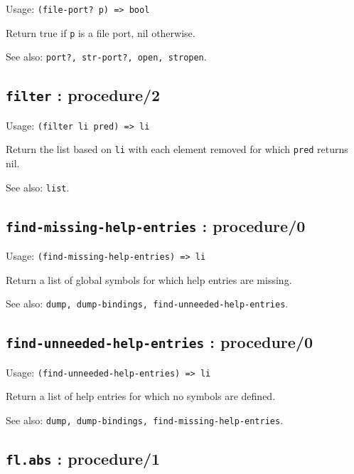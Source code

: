\documentclass[
]{article}
\newcommand{\passthrough}[1]{#1}
\begin{document}
Usage: \passthrough{\lstinline!(file-port? p) => bool!}

Return true if \passthrough{\lstinline!p!} is a file port, nil
otherwise.

See also: \passthrough{\lstinline!port?, str-port?, open, stropen!}.

\hypertarget{filter-procedure2-1}{%
\subsection{\texorpdfstring{\texttt{filter} :
procedure/2}{filter : procedure/2}}\label{filter-procedure2-1}}

Usage: \passthrough{\lstinline!(filter li pred) => li!}

Return the list based on \passthrough{\lstinline!li!} with each element
removed for which \passthrough{\lstinline!pred!} returns nil.

See also: \passthrough{\lstinline!list!}.

\hypertarget{find-missing-help-entries-procedure0-1}{%
\subsection{\texorpdfstring{\texttt{find-missing-help-entries} :
procedure/0}{find-missing-help-entries : procedure/0}}\label{find-missing-help-entries-procedure0-1}}

Usage: \passthrough{\lstinline!(find-missing-help-entries) => li!}

Return a list of global symbols for which help entries are missing.

See also:
\passthrough{\lstinline!dump, dump-bindings, find-unneeded-help-entries!}.

\hypertarget{find-unneeded-help-entries-procedure0-1}{%
\subsection{\texorpdfstring{\texttt{find-unneeded-help-entries} :
procedure/0}{find-unneeded-help-entries : procedure/0}}\label{find-unneeded-help-entries-procedure0-1}}

Usage: \passthrough{\lstinline!(find-unneeded-help-entries) => li!}

Return a list of help entries for which no symbols are defined.

See also:
\passthrough{\lstinline!dump, dump-bindings, find-missing-help-entries!}.

\hypertarget{fl.abs-procedure1-1}{%
\subsection{\texorpdfstring{\texttt{fl.abs} :
procedure/1}{fl.abs : procedure/1}}\label{fl.abs-procedure1-1}}
\end{document}
